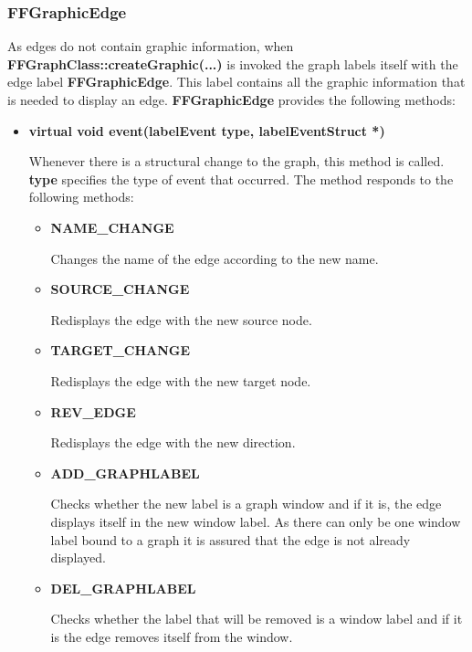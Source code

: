 \subsubsection{FFGraphicEdge}
\label{ffgraphicedge}

As edges do not contain graphic information, when {\bf
  FFGraphClass::createGraphic(...)} is invoked the graph labels
itself with the edge label {\bf FFGraphicEdge}. This label
contains all the graphic information that is needed to display an
edge. {\bf FFGraphicEdge} provides the following methods:

\begin{itemize}

\item{\bf virtual void event(labelEvent type, labelEventStruct *)}
    
Whenever there is a structural change to the graph, this method is
called. {\bf type} specifies the type of event that occurred. The
method responds to the following methods:

\begin{itemize}

\item{\bf NAME\_CHANGE}

Changes the name of the edge according to the new name.

\item{\bf SOURCE\_CHANGE}

Redisplays the edge with the new source node.

\item{\bf TARGET\_CHANGE}

Redisplays the edge with the new target node.

\item{\bf REV\_EDGE}

Redisplays the edge with the new direction.

\item{\bf ADD\_GRAPHLABEL}

Checks whether the new label is a graph window and if it is, the edge
displays itself in the new window label. As there can only be one
window label bound to a graph it is assured that the edge is not
already displayed.

\item{\bf DEL\_GRAPHLABEL}

Checks whether the label that will be removed is a window label and
if it is the edge removes itself from the window.

\end{itemize}


\end{itemize}

